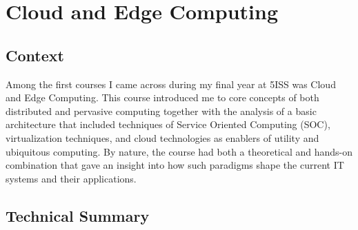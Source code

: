 \section{Cloud and Edge Computing}
\subsection{Context}
\indent \indent Among the first courses I came across during my final year at 5ISS was Cloud and Edge Computing. This course introduced me to core concepts of both distributed and pervasive computing together with the analysis of a basic architecture that included techniques of Service Oriented Computing (SOC), virtualization techniques, and cloud technologies as enablers of utility and ubiquitous computing. By nature, the course had both a theoretical and hands-on combination that gave an insight into how such paradigms shape the current IT systems and their applications.

\subsection{Technical Summary} %

